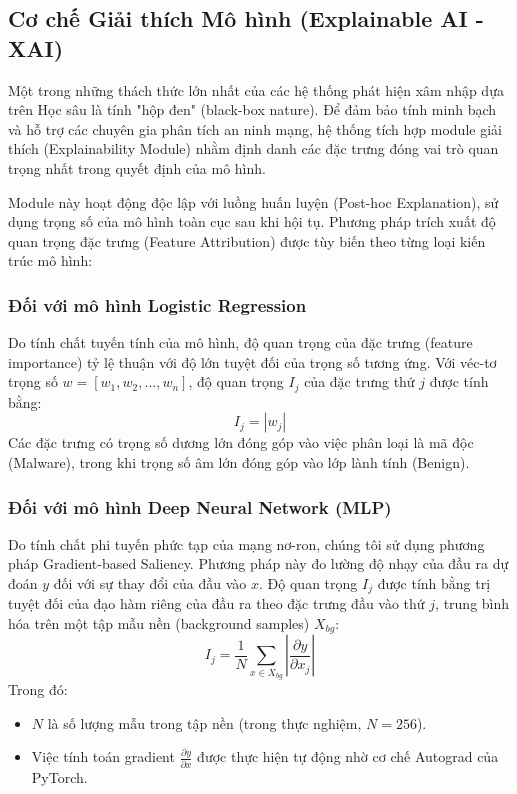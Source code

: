 \subsection{Cơ chế Giải thích Mô hình (Explainable AI - XAI)}

Một trong những thách thức lớn nhất của các hệ thống phát hiện xâm nhập dựa trên Học sâu là tính "hộp đen" (black-box nature). Để đảm bảo tính minh bạch và hỗ trợ các chuyên gia phân tích an ninh mạng, hệ thống tích hợp module giải thích (Explainability Module) nhằm định danh các đặc trưng đóng vai trò quan trọng nhất trong quyết định của mô hình.

Module này hoạt động độc lập với luồng huấn luyện (Post-hoc Explanation), sử dụng trọng số của mô hình toàn cục sau khi hội tụ. Phương pháp trích xuất độ quan trọng đặc trưng (Feature Attribution) được tùy biến theo từng loại kiến trúc mô hình:

\subsubsection{Đối với mô hình Logistic Regression}
Do tính chất tuyến tính của mô hình, độ quan trọng của đặc trưng (feature importance) tỷ lệ thuận với độ lớn tuyệt đối của trọng số tương ứng.
Với véc-tơ trọng số $w = [w_1, w_2, ..., w_n]$, độ quan trọng $I_j$ của đặc trưng thứ $j$ được tính bằng:
$$I_j = |w_j|$$
Các đặc trưng có trọng số dương lớn đóng góp vào việc phân loại là mã độc (Malware), trong khi trọng số âm lớn đóng góp vào lớp lành tính (Benign).

\subsubsection{Đối với mô hình Deep Neural Network (MLP)}
Do tính chất phi tuyến phức tạp của mạng nơ-ron, chúng tôi sử dụng phương pháp Gradient-based Saliency. Phương pháp này đo lường độ nhạy của đầu ra dự đoán $y$ đối với sự thay đổi của đầu vào $x$.
Độ quan trọng $I_j$ được tính bằng trị tuyệt đối của đạo hàm riêng của đầu ra theo đặc trưng đầu vào thứ $j$, trung bình hóa trên một tập mẫu nền (background samples) $X_{bg}$:
$$I_j = \frac{1}{N} \sum_{x \in X_{bg}} \left| \frac{\partial y}{\partial x_j} \right|$$
Trong đó:
\begin{itemize}
    \item $N$ là số lượng mẫu trong tập nền (trong thực nghiệm, $N=256$).
    \item Việc tính toán gradient $\frac{\partial y}{\partial x}$ được thực hiện tự động nhờ cơ chế Autograd của PyTorch.
\end{itemize}

